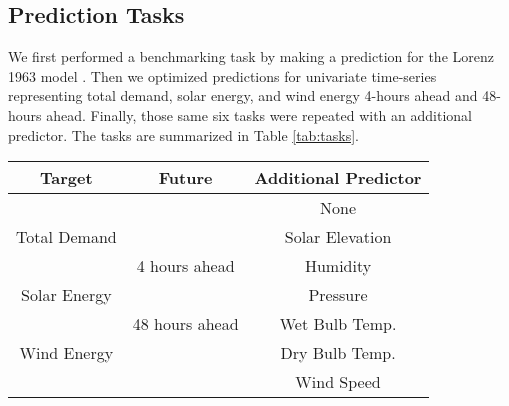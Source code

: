  \subsection{Prediction Tasks}

We first performed a benchmarking task by making a prediction for the Lorenz
1963 model \cite{lorenz_deterministic_1963}. Then we optimized predictions for
univariate time-series
representing total demand, solar energy, and wind energy 4-hours ahead and
48-hours ahead. Finally, those same six tasks were repeated with an additional
predictor. The tasks are summarized in Table \ref{tab:tasks}.

\begin{table*}[ht]
  \centering
  \caption{Summary of Prediction Tasks}
  \label{tab:tasks}
  \begin{tabular}{c|c|c}
    \hline
    Target & Future & Additional Predictor\\
    \hline
    && None \\
    Total Demand && Solar Elevation\\
    &4 hours ahead& Humidity\\
    Solar Energy && Pressure\\
    &48 hours ahead& Wet Bulb Temp.\\
    Wind Energy && Dry Bulb Temp.\\
    && Wind Speed\\
  \end{tabular}\\[-1.4pt]%

\end{table*}

